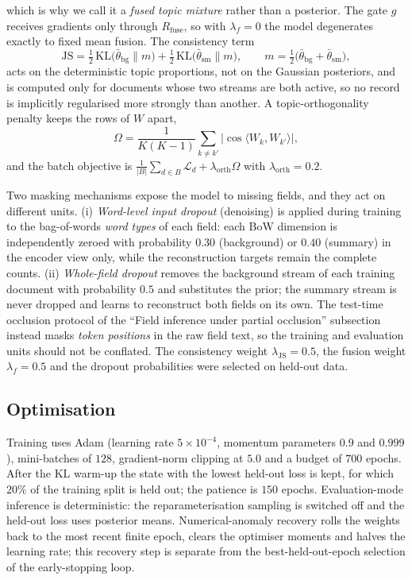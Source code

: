 \documentclass[Journal,letterpaper]{ascelike-new}
\begin{document}
which is why we call it a \emph{fused topic mixture} rather than a posterior. The gate
$g$ receives gradients only through $R_{\mathrm{fuse}}$, so with $\lambda_f=0$ the model
degenerates exactly to fixed mean fusion. The consistency term
\begin{equation}
\mathrm{JS}=\tfrac12\,\mathrm{KL}\!\big(\bar\theta_{\mathrm{bg}}\|m\big)
+\tfrac12\,\mathrm{KL}\!\big(\bar\theta_{\mathrm{sm}}\|m\big),
\qquad m=\tfrac12\big(\bar\theta_{\mathrm{bg}}+\bar\theta_{\mathrm{sm}}\big),
\end{equation}
acts on the deterministic topic proportions, not on the Gaussian posteriors, and is computed only
for documents whose two streams are both active, so no record is implicitly regularised more
strongly than another. A topic-orthogonality penalty keeps the rows of $W$ apart,
\begin{equation}
\Omega=\frac{1}{K(K-1)}\sum_{k\neq k'}\big|\cos\langle W_k,W_{k'}\rangle\big|,
\end{equation}
and the batch objective is $\frac{1}{|B|}\sum_{d\in B}\mathcal{L}_d
+\lambda_{\mathrm{orth}}\Omega$ with $\lambda_{\mathrm{orth}}=0.2$.

Two masking mechanisms expose the model to missing fields, and they act on different units.
(i) \emph{Word-level input dropout} (denoising) is applied during training to the bag-of-words
\emph{word types} of each field: each BoW dimension is independently zeroed with probability
$0.30$ (background) or $0.40$ (summary) in the encoder view only, while the reconstruction
targets remain the complete counts. (ii) \emph{Whole-field dropout} removes the background stream
of each training document with probability $0.5$ and substitutes the prior; the summary stream is
never dropped and learns to reconstruct both fields on its own. The test-time occlusion protocol
of the ``Field inference under partial occlusion'' subsection instead masks \emph{token positions} in the raw field text, so the
training and evaluation units should not be conflated. The consistency weight
$\lambda_{\mathrm{JS}}=0.5$, the fusion weight $\lambda_f=0.5$ and the dropout probabilities were
selected on held-out data.

\subsection{Optimisation}

Training uses Adam (learning rate $5\times10^{-4}$, momentum parameters $0.9$ and $0.999$),
mini-batches of $128$, gradient-norm clipping at $5.0$ and a budget of $700$ epochs. After the KL
warm-up the state with the lowest held-out loss is kept, for which $20\%$ of the training split is
held out; the patience is $150$ epochs. Evaluation-mode inference is deterministic: the
reparameterisation sampling is switched off and the held-out loss uses posterior means.
Numerical-anomaly recovery rolls the weights back to the most recent finite epoch, clears the
optimiser moments and halves the learning rate; this recovery step is separate from the
best-held-out-epoch selection of the early-stopping loop.
\end{document}

